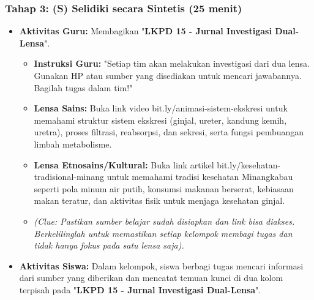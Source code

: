 \documentclass[a4paper,12pt]{article}
\begin{document}
\subsubsection{Tahap 3: (S) Selidiki secara Sintetis (25 menit)}
\begin{itemize}
\item \textbf{Aktivitas Guru:} Membagikan "\textbf{LKPD 15 - Jurnal Investigasi Dual-Lensa}".
    \begin{itemize}
    \item \textbf{Instruksi Guru:} "Setiap tim akan melakukan investigasi dari dua lensa. Gunakan HP atau sumber yang disediakan untuk mencari jawabannya. Bagilah tugas dalam tim!"
    \item \textbf{Lensa Sains:} Buka link video bit.ly/animasi-sistem-ekskresi untuk memahami struktur sistem ekskresi (ginjal, ureter, kandung kemih, uretra), proses filtrasi, reabsorpsi, dan sekresi, serta fungsi pembuangan limbah metabolisme.
    \item \textbf{Lensa Etnosains/Kultural:} Buka link artikel bit.ly/kesehatan-tradisional-minang untuk memahami tradisi kesehatan Minangkabau seperti pola minum air putih, konsumsi makanan berserat, kebiasaan makan teratur, dan aktivitas fisik untuk menjaga kesehatan ginjal.
    \item \textit{(Clue: Pastikan sumber belajar sudah disiapkan dan link bisa diakses. Berkelilinglah untuk memastikan setiap kelompok membagi tugas dan tidak hanya fokus pada satu lensa saja).}
    \end{itemize}
\item \textbf{Aktivitas Siswa:} Dalam kelompok, siswa berbagi tugas mencari informasi dari sumber yang diberikan dan mencatat temuan kunci di dua kolom terpisah pada "\textbf{LKPD 15 - Jurnal Investigasi Dual-Lensa}".
\end{itemize}
\end{document}
